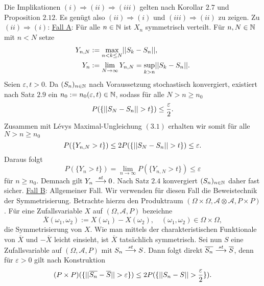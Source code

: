 \begin{proof*}%
    Die Implikationen $(i) \Rightarrow (ii) \Rightarrow (iii)$ gelten nach Korollar $2.7$ und Proposition $2.12$. Es genügt also $(ii) \Rightarrow (i)$ und $(iii) \Rightarrow (ii)$ zu zeigen. 
    \newline 
    Zu $(ii) \Rightarrow (i)$: \underline{Fall A}: Für alle $n \in \mathbb{N}$ ist $X_n$ symmetrisch verteilt. 
    \newline 
    Für $n, N \in \mathbb{N}$ mit $n < N$ setze 
    \begin{align*}
        Y_{n,N} &:= \max_{n < k \leq N}\lvert\lvert S_k - S_n \rvert\rvert, \\\
        Y_n     &:= \lim_{N \to \infty} Y_{n,N} = \sup_{k > n} \lvert\lvert S_k - S_n \rvert\rvert. 
    \end{align*}
    Seien $\varepsilon, t > 0$. Da $(S_n)_{n \in \mathbb{N}}$ nach Voraussetzung stochastisch konvergiert, existiert nach Satz $2.9$ ein $n_0 := n_0(\varepsilon,t) \in \mathbb{N}$, sodass für alle $N > n \geq n_0$ 
    $$
        P(\{ \lvert\lvert S_N - S_n \rvert\rvert > t\}) \leq \frac{\varepsilon}{2}.
    $$
    Zusammen mit Lévys Maximal-Ungleichung $(3.1)$ erhalten wir somit für alle $N > n \geq n_0$
    $$
        P(\{ Y_{n, N} > t\}) \leq 2P(\{ \lvert\lvert S_N - S_n \rvert\rvert > t\}) \leq \varepsilon . 
    $$
    Daraus folgt 
    $$
        P(\{Y_n > t \}) = \lim_{n \to \infty}P(\{Y_{n,N} > t \}) \leq \varepsilon
    $$
    für $n \geq n_0$. Demnach gilt $Y_n \overset{st}{\longrightarrow} 0$. Nach Satz $2.4$ konvergiert $(S_n)_{n \in \mathbb{N}}$ daher fast sicher. 
    \newline \underline{Fall B}: Allgemeiner Fall.
    \newline 
    Wir verwenden für diesen Fall die Beweistechnik der Symmetrisierung.  
    Betrachte hierzu den Produktraum $(\Omega \times \Omega, \mathcal{A}\otimes\mathcal{A}, P \times P)$. Für eine Zufallsvariable $X$ auf $(\Omega, \mathcal{A}, P)$ bezeichne
    $$
        \overline{X}(\omega_1, \omega_2) := X(\omega_1) - X(\omega_2), \quad (\omega_1, \omega_2) \in \Omega \times \Omega,
    $$   
    die Symmetrisierung von $X$. Wie man mittels der charakteristischen Funktionale von $\overline{X}$ und $-\overline{X}$ leicht einsieht, ist $\overline{X}$ tatsächlich symmetrisch. 
    Sei nun $S$ eine Zufallsvariable auf $(\Omega, \mathcal{A}, P)$ mit $S_n \overset{st}{\longrightarrow} S$. 
    Dann folgt direkt $\overline{S_n} \overset{st}{\longrightarrow} \overline{S}$, denn für $\varepsilon > 0$ gilt nach Konstruktion
    $$
        (P\times P)(\{ \lvert\lvert \overline{S_n} - \overline{S} \rvert\rvert > \varepsilon \} ) \leq 2P(\{ \lvert\lvert S_n - S \rvert\rvert > \frac{\varepsilon}{2} \}).
$$
\end{proof*}
